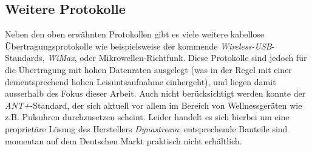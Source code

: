     \subsection{Weitere Protokolle}
        Neben den oben erwähnten Protokollen gibt es viele weitere kabellose Übertragungsprotokolle wie beispielsweise 
        der kommende \emph{Wireless-USB}-Standards, \emph{WiMax}, oder Mikrowellen-Richtfunk. Diese Protokolle sind 
        jedoch für die Übertragung mit hohen Datenraten ausgelegt (was in der Regel mit einer dementsprechend 
        hohen Leisuntsaufnahme einhergeht), und liegen damit ausserhalb des Fokus dieser Arbeit. Auch nicht
        berücksichtigt werden konnte der \emph{ANT+}-Standard, der sich aktuell vor allem im Bereich von Wellnessgeräten
        wie z.B. Pulsuhren durchzusetzen scheint. Leider handelt es sich hierbei um eine proprietäre Lösung des 
        Herstellers \emph{Dynastream}; entsprechende Bauteile sind momentan auf dem Deutschen Markt praktisch nicht
        erhältlich.


